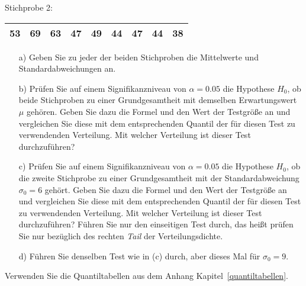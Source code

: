 Stichprobe 2:

\begin{tabular}{|c|c|c|c|c|c|c|c|c|}
\hline
53 & 69 & 63 & 47 & 49 & 44 & 47 & 44 & 38\\
\hline
\end{tabular}

\begin{enumerate}
\item[a)] Geben Sie zu jeder der beiden Stichproben die Mittelwerte und Standardabweichungen an.
\item[b)] Prüfen Sie auf einem Signifikanzniveau von $\alpha = 0.05$ die Hypothese $H_0$,
 ob beide Stichproben zu einer Grundgesamtheit
 mit demselben Erwartungswert $\mu$ gehören. Geben Sie dazu die Formel und den Wert
 der Testgröße an und vergleichen Sie diese mit dem entsprechenden Quantil der für diesen
 Test zu verwendenden Verteilung. Mit welcher Verteilung ist dieser Test durchzuführen?
\item[c)] Prüfen Sie auf einem Signifikanzniveau von $\alpha = 0.05$ die Hypothese $H_0$,
 ob die zweite Stichprobe zu einer Grundgesamtheit
 mit der Standardabweichung $\sigma_0 = 6$ gehört. Geben Sie dazu die Formel und den Wert
 der Testgröße an und vergleichen Sie diese mit dem entsprechenden Quantil der für diesen
 Test zu verwendenden Verteilung. Mit welcher Verteilung ist dieser Test durchzuführen?
 Führen Sie nur den einseitigen Test durch, das heißt prüfen Sie nur bezüglich
 des rechten \textsl{Tail} der Verteilungsdichte.
\item[d)] Führen Sie denselben Test wie in (c) durch, aber dieses Mal für $\sigma_0 = 9$.
\end{enumerate}

Verwenden Sie die Quantiltabellen aus dem Anhang Kapitel~\ref{quantiltabellen}.
